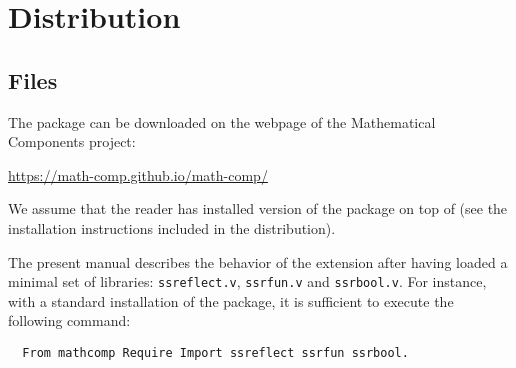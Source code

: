 \section{Distribution}

\subsection{Files}\label{sec:files}
The \ssr{} package can be downloaded on the webpage of the
Mathematical Components project:

\centerline{\url{https://math-comp.github.io/math-comp/}}


We assume that the reader has installed version \ssrversion{} of the
\ssr{} package on top of \Coq{} (see the installation instructions
included in the distribution).

The present manual describes the behavior of
the \ssr{} extension after having loaded a minimal set of libraries:
{\tt ssreflect.v}, {\tt ssrfun.v} and {\tt ssrbool.v}. For instance,
with a standard installation of the \ssr{} package, it is sufficient
to execute the following command:

\begin{lstlisting}
  From mathcomp Require Import ssreflect ssrfun ssrbool.
\end{lstlisting}


